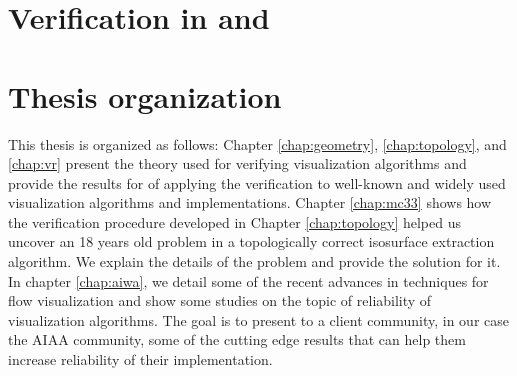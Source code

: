 \section{Verification in \cs{} and \cse{}}

\section{Thesis organization}

This thesis is organized as follows: Chapter \ref{chap:geometry}, \ref{chap:topology}, and \ref{chap:vr} present the theory used for verifying visualization algorithms and provide the results for of applying the verification to well-known and widely used visualization algorithms and implementations. Chapter \ref{chap:mc33} shows how the verification procedure developed in Chapter \ref{chap:topology} helped us uncover an 18 years old problem in a topologically correct isosurface extraction algorithm. We explain the details of the problem and provide the solution for it. In chapter \ref{chap:aiwa}, we detail some of the recent advances in techniques for flow visualization and show some studies on the topic of reliability of visualization algorithms. The goal is to present to a client community, in our case the AIAA community, some of the cutting edge results that can help them increase reliability of their implementation.

